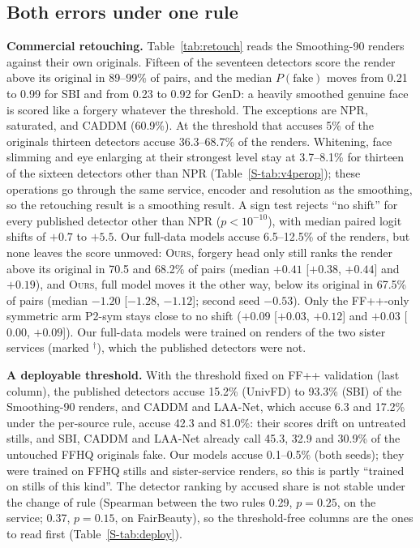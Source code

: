 \documentclass[conference]{IEEEtran}
\newcommand{\oursB}{\textsc{Ours}, forgery head only}
\newcommand{\oursF}{\textsc{Ours}, full model}
\begin{document}
\subsection{Both errors under one rule}
\label{sec:measure}
\textbf{Commercial retouching.} Table~\ref{tab:retouch} reads the Smoothing-90 renders against their own originals. Fifteen of
the seventeen detectors score the render above its original in 89--99\% of pairs, and the median $P(\text{fake})$ moves from
0.21 to 0.99 for SBI and from 0.23 to 0.92 for GenD: a heavily smoothed genuine face is scored like a forgery whatever the
threshold. The exceptions are NPR, saturated, and CADDM (60.9\%). At the threshold that accuses 5\% of the originals thirteen
detectors accuse 36.3--68.7\% of the renders. Whitening, face slimming and eye enlarging at their strongest level stay at
3.7--8.1\% for thirteen of the sixteen detectors other than NPR (Table~\ref{S-tab:v4perop}); these operations go through the same
service, encoder and resolution as the smoothing, so the retouching result is a smoothing result. A sign test rejects ``no
shift'' for every published detector other than NPR ($p<10^{-10}$), with median paired logit shifts of $+0.7$ to $+5.5$. Our
full-data models accuse 6.5--12.5\% of the renders, but none leaves the score unmoved: \oursB{} still ranks the render above its
original in 70.5 and 68.2\% of pairs (median $+0.41$ [$+0.38$, $+0.44$] and $+0.19$), and \oursF{} moves it the other way, below
its original in 67.5\% of pairs (median $-1.20$ [$-1.28$, $-1.12$]; second seed $-0.53$). Only the FF++-only symmetric arm
P2-sym stays close to no shift ($+0.09$ [$+0.03$, $+0.12$] and $+0.03$ [$0.00$, $+0.09$]). Our full-data models were trained on
renders of the two sister services (marked $^\dagger$), which the published detectors were not.

\textbf{A deployable threshold.} With the threshold fixed on FF++ validation (last column), the published detectors accuse
15.2\% (UnivFD) to 93.3\% (SBI) of the Smoothing-90 renders, and CADDM and LAA-Net, which accuse 6.3 and 17.2\% under the
per-source rule, accuse 42.3 and 81.0\%: their scores drift on untreated stills, and SBI, CADDM and LAA-Net already call 45.3,
32.9 and 30.9\% of the untouched FFHQ originals fake. Our models accuse 0.1--0.5\% (both seeds); they were trained on FFHQ
stills and sister-service renders, so this is partly ``trained on stills of this kind''. The detector ranking by accused share
is not stable under the change of rule (Spearman between the two rules 0.29, $p=0.25$, on the service; 0.37, $p=0.15$, on
FairBeauty), so the threshold-free columns are the ones to read first (Table~\ref{S-tab:deploy}).
\end{document}
